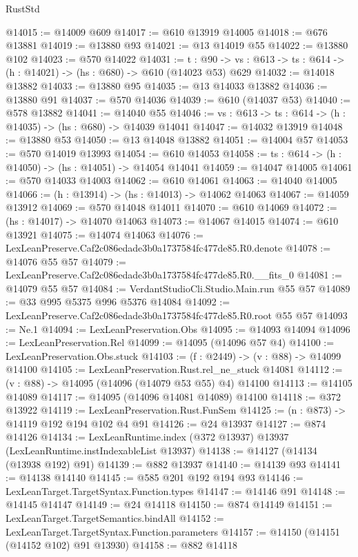 \begin{lexlean}{RustStd}
\begin{coremodule}
@14015 := @14009 @609
@14017 := @610 @13919 @14005
@14018 := @676 @13881
@14019 := @13880 @93
@14021 := @13 @14019 @55
@14022 := @13880 @102
@14023 := @570 @14022
@14031 := {t : @90} ->
  {vs : @613} -> {ts : @614} -> (h : @14021) -> (hs : @680) -> @610 (@14023 @53) @629
@14032 := @14018 @13882
@14033 := @13880 @95
@14035 := @13 @14033 @13882
@14036 := @13880 @91
@14037 := @570 @14036
@14039 := @610 (@14037 @53)
@14040 := @578 @13882
@14041 := @14040 @55
@14046 := {vs : @613} -> {ts : @614} -> (h : @14035) -> (hs : @680) -> @14039 @14041
@14047 := @14032 @13919
@14048 := @13880 @53
@14050 := @13 @14048 @13882
@14051 := @14004 @57
@14053 := @570 @14019 @13993
@14054 := @610 @14053
@14058 := {ts : @614} -> (h : @14050) -> (hs : @14051) -> @14054 @14041
@14059 := @14047 @14005
@14061 := @570 @14033 @14003
@14062 := @610 @14061
@14063 := @14040 @14005
@14066 := (h : @13914) -> (hs : @14013) -> @14062 @14063
@14067 := @14059 @13912
@14069 := @570 @14048 @14011
@14070 := @610 @14069
@14072 := (hs : @14017) -> @14070 @14063
@14073 := @14067 @14015
@14074 := @610 @13921
@14075 := @14074 @14063
@14076 := LexLeanPreserve.Caf2c086edade3b0a1737584fc477de85.R0.denote
@14078 := @14076 @55 @57
@14079 := LexLeanPreserve.Caf2c086edade3b0a1737584fc477de85.R0.__fits_0
@14081 := @14079 @55 @57
@14084 := VerdantStudioCli.Studio.Main.run @55 @57
@14089 := @33 @995 @5375 @996 @5376 @14084
@14092 := LexLeanPreserve.Caf2c086edade3b0a1737584fc477de85.R0.root @55 @57
@14093 := Ne.{1}
@14094 := LexLeanPreservation.Obs
@14095 := @14093 @14094
@14096 := LexLeanPreservation.Rel
@14099 := @14095 (@14096 @57 @4)
@14100 := LexLeanPreservation.Obs.stuck
@14103 := (f : @2449) -> (v : @88) -> @14099 @14100
@14105 := LexLeanPreservation.Rust.rel_ne_stuck @14081
@14112 := (v : @88) -> @14095 (@14096 (@14079 @53 @55) @4) @14100
@14113 := @14105 @14089
@14117 := @14095 (@14096 @14081 @14089) @14100
@14118 := @372 @13922
@14119 := LexLeanPreservation.Rust.FunSem
@14125 := (n : @873) -> @14119 @192 @194 @102 @4 @91
@14126 := @24 @13937
@14127 := @874 @14126
@14134 := LexLeanRuntime.index (@372 @13937) @13937 (LexLeanRuntime.instIndexableList @13937)
@14138 := @14127 (@14134 (@13938 @192) @91)
@14139 := @882 @13937
@14140 := @14139 @93
@14141 := @14138 @14140
@14145 := @585 @201 @192 @194 @93
@14146 := LexLeanTarget.TargetSyntax.Function.types
@14147 := @14146 @91
@14148 := @14145 @14147
@14149 := @24 @14118
@14150 := @874 @14149
@14151 := LexLeanTarget.TargetSemantics.bindAll
@14152 := LexLeanTarget.TargetSyntax.Function.parameters
@14157 := @14150 (@14151 (@14152 @102) @91 @13930)
@14158 := @882 @14118

\end{coremodule}
\end{lexlean}
